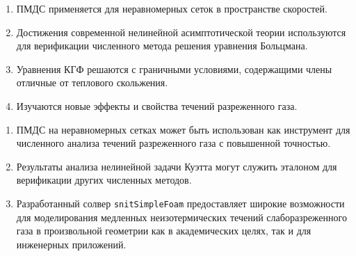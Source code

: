 {\novelty}
\begin{enumerate}
    \item ПМДС применяется для неравномерных сеток в пространстве скоростей. %
    \item Достижения современной нелинейной асимптотической теории используются
    для верификации численного метода решения уравнения Больцмана. %
    \item Уравнения КГФ решаются с граничными условиями, содержащими члены отличные от теплового скольжения. %
    \item Изучаются новые эффекты и свойства течений разреженного газа. %
\end{enumerate}

{\influence}
\begin{enumerate}
    \item ПМДС на неравномерных сетках может быть использован
    как инструмент для численного анализа течений разреженного газа с повышенной точностью.
    \item Результаты анализа нелинейной задачи Куэтта могут служить эталоном
    для верификации других численных методов.
    \item Разработанный солвер \verb+snitSimpleFoam+ предоставляет широкие возможности
    для моделирования медленных неизотермических течений слаборазреженного газа в произвольной геометрии
    как в академических целях, так и для инженерных приложений.
\end{enumerate}

